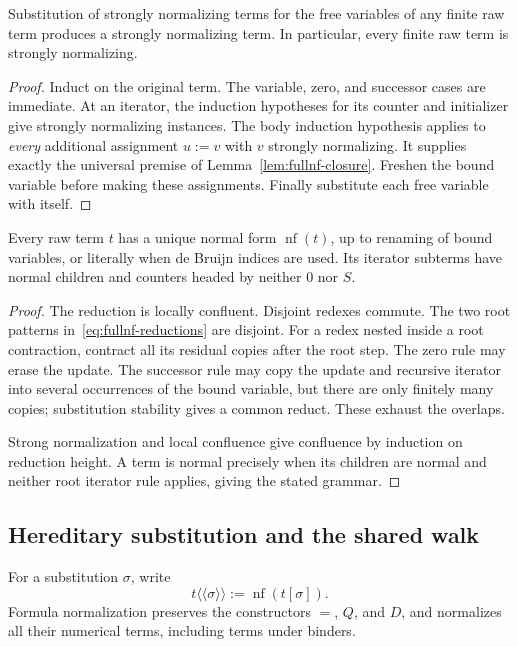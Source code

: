 \begin{theorem}
\label{thm:fullnf-sn}
Substitution of strongly normalizing terms for the free variables of any
finite raw term produces a strongly normalizing term.  In particular,
every finite raw term is strongly normalizing.
\end{theorem}
\begin{proof}
Induct on the original term.  The variable, zero, and successor cases are
immediate.  At an iterator, the induction hypotheses for its counter and
initializer give strongly normalizing instances.  The body induction
hypothesis applies to \emph{every} additional assignment $u:=v$ with $v$
strongly normalizing.  It supplies exactly the universal premise of
Lemma~\ref{lem:fullnf-closure}.  Freshen the bound variable before making
these assignments.  Finally substitute each free variable with itself.
\end{proof}

\begin{lemma}
\label{lem:fullnf-confluence}
Every raw term $t$ has a unique normal form $\operatorname{nf}(t)$, up to
renaming of bound variables, or literally when de Bruijn indices are used.
Its iterator subterms have normal children and counters headed by neither
$0$ nor $S$.
\end{lemma}
\begin{proof}
The reduction is locally confluent.  Disjoint redexes commute.  The two
root patterns in~\eqref{eq:fullnf-reductions} are disjoint.  For a redex
nested inside a root contraction, contract all its residual copies after
the root step.  The zero rule may erase the update.  The successor rule
may copy the update and recursive iterator into several occurrences of
the bound variable, but there are only finitely many copies; substitution
stability gives a common reduct.  These exhaust the overlaps.

Strong normalization and local confluence give confluence by induction on
reduction height.  A term is normal precisely when its children are normal
and neither root iterator rule applies, giving the stated grammar.
\end{proof}

\subsection{Hereditary substitution and the shared walk}

For a substitution $\sigma$, write
\[
 t\langle\!\langle\sigma\rangle\!\rangle
       :=\operatorname{nf}(t[\sigma]).
\]
Formula normalization preserves the constructors $=$, $Q$, and $D$, and
normalizes all their numerical terms, including terms under binders.

